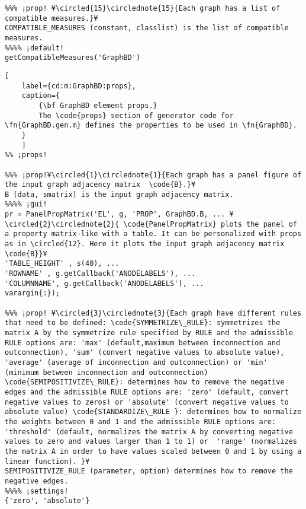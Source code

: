 \documentclass{tufte-handout}
\begin{document}
\begin{lstlisting}
%%% ¡prop! ¥\circled{15}\circlednote{15}{Each graph has a list of compatible measures.}¥
COMPATIBLE_MEASURES (constant, classlist) is the list of compatible measures.
%%%% ¡default!
getCompatibleMeasures('GraphBD')
\end{lstlisting}



\begin{lstlisting}[
	label={cd:m:GraphBD:props},
	caption={
		{\bf GraphBD element props.}
		The \code{props} section of generator code for \fn{GraphBD.gen.m} defines the properties to be used in \fn{GraphBD}.
	}
	]
%% ¡props!

%%% ¡prop!¥\circled{1}\circlednote{1}{Each graph has a panel figure of the input graph adjacency matrix  \code{B}.}¥
B (data, smatrix) is the input graph adjacency matrix.
%%%% ¡gui!
pr = PanelPropMatrix('EL', g, 'PROP', GraphBD.B, ... ¥\circled{2}\circlednote{2}{ \code{PanelPropMatrix} plots the panel of a property matrix-like with a table. It can be personalized with props as in \circled{12}. Here it plots the input graph adjacency matrix \code{B}}¥
'TABLE_HEIGHT' , s(40), ...
'ROWNAME' , g.getCallback('ANODELABELS'), ... 
'COLUMNNAME', g.getCallback('ANODELABELS'), ...
varargin{:});

%%% ¡prop! ¥\circled{3}\circlednote{3}{Each graph have different rules that need to be defined: \code{SYMMETRIZE\_RULE}: symmetrizes the matrix A by the symmetrize rule specified by RULE and the admissible RULE options are: 'max' (default,maximum between inconnection and outconnection), 'sum' (convert negative values to absolute value), 'average' (average of inconnection and outconnection) or 'min' (minimum between inconnection and outconnection) \code{SEMIPOSITIVIZE\_RULE}: determines how to remove the negative edges and the admissible RULE options are: 'zero' (default, convert negative values to zeros) or 'absolute' (convert negative values to absolute value) \code{STANDARDIZE\_RULE }: determines how to normalize the weights between 0 and 1 and the admissible RULE options are: 'threshold' (default, normalizes the matrix A by converting negative values to zero and values larger than 1 to 1) or  'range' (normalizes the matrix A in order to have values scaled between 0 and 1 by using a linear function). }¥
SEMIPOSITIVIZE_RULE (parameter, option) determines how to remove the negative edges.
%%%% ¡settings!
{'zero', 'absolute'}

\end{lstlisting}

\clearpage
\end{document}
